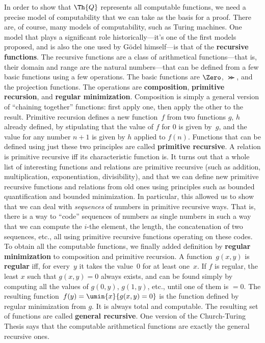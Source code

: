In order to show that $\Th{Q}$ represents all computable functions, we
need a precise model of computability that we can take as the basis
for a proof.  There are, of course, many models of computability, such
as Turing machines. One model that plays a significant role
historically---it's one of the first models proposed, and is also the
one used by G\"odel himself---is that of the \textbf{recursive
  functions}.  The recursive functions are a class of arithmetical
functions---that is, their domain and range are the natural
numbers---that can be defined from a few basic functions using a few
operations. The basic functions are $\Zero$, $\Succ$, and the
projection functions. The operations are \textbf{composition},
\textbf{primitive recursion}, and \textbf{regular
  minimization}. Composition is simply a general version of ``chaining
together'' functions: first apply one, then apply the other to the
result. Primitive recursion defines a new function~$f$ from two
functions $g$, $h$ already defined, by stipulating that the value of
$f$ for $0$ is given by~$g$, and the value for any number $n+1$ is
given by $h$ applied to $f(n)$.  Functions that can be defined using
just these two principles are called \textbf{primitive recursive}. A
relation is primitive recursive iff its characteristic function is. It
turns out that a whole list of interesting functions and relations are
primitive recursive (such as addition, multiplication, exponentiation,
divisibility), and that we can define new primitive recursive
functions and relations from old ones using principles such as bounded
quantification and bounded minimization. In particular, this allowed
us to show that we can deal with \emph{sequences} of numbers in
primitive recursive ways. That is, there is a way to ``code''
sequences of numbers as single numbers in such a way that we can
compute the $i$-the element, the length, the concatenation of two
sequences, etc., all using primitive recursive functions operating on
these codes.  To obtain all the computable functions, we finally added
definition by \textbf{regular minimization} to composition and
primitive recursion.  A function~$g(x, y)$ is \textbf{regular} iff,
for every~$y$ it takes the value~$0$ for at least one~$x$. If $f$ is
regular, the least $x$ such that $g(x, y) = 0$ always exists, and can
be found simply by computing all the values of $g(0, y)$, $g(1, y)$,
etc., until one of them is $= 0$. The resulting function~$f(y) =
\umin{x}{g(x, y) = 0}$ is the function defined by regular minimization
from $g$. It is always total and computable. The resulting set of
functions are called \textbf{general recursive}.  One version of the
Church-Turing Thesis says that the computable arithmetical functions
are exactly the general recursive ones.
